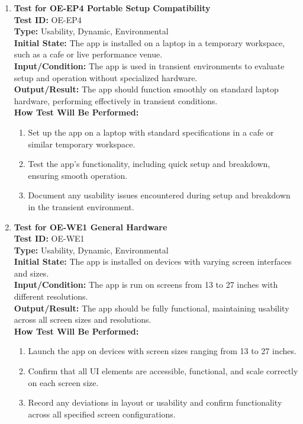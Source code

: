 \documentclass[12pt, titlepage]{article}
\begin{document}
\begin{enumerate}
    \item \textbf{Test for OE-EP4 Portable Setup Compatibility} \\
      \newline
      \textbf{Test ID:} OE-EP4 \\
      \textbf{Type:} Usability, Dynamic, Environmental \\
      \textbf{Initial State:} The app is installed on a laptop in a temporary workspace, such as a cafe or live performance venue. \\
      \textbf{Input/Condition:} The app is used in transient environments to evaluate setup and operation without specialized 
      hardware. \\
      \textbf{Output/Result:} The app should function smoothly on standard laptop hardware, performing effectively in transient 
      conditions. \\
      \textbf{How Test Will Be Performed:}
      \begin{enumerate}
          \item Set up the app on a laptop with standard specifications in a cafe or similar temporary workspace.
          \item Test the app’s functionality, including quick setup and breakdown, ensuring smooth operation.
          \item Document any usability issues encountered during setup and breakdown in the transient environment.
      \end{enumerate}

    \item \textbf{Test for OE-WE1 General Hardware} \\
      \newline
      \textbf{Test ID:} OE-WE1 \\
      \textbf{Type:} Usability, Dynamic, Environmental \\
      \textbf{Initial State:} The app is installed on devices with varying screen interfaces and sizes. \\
      \textbf{Input/Condition:} The app is run on screens from 13 to 27 inches with different resolutions. \\
      \textbf{Output/Result:} The app should be fully functional, maintaining usability across all screen sizes and resolutions. \\
      \textbf{How Test Will Be Performed:}
      \begin{enumerate}
          \item Launch the app on devices with screen sizes ranging from 13 to 27 inches.
          \item Confirm that all UI elements are accessible, functional, and scale correctly on each screen size.
          \item Record any deviations in layout or usability and confirm functionality across all specified screen configurations.
      \end{enumerate}


\end{enumerate}
\end{document}
